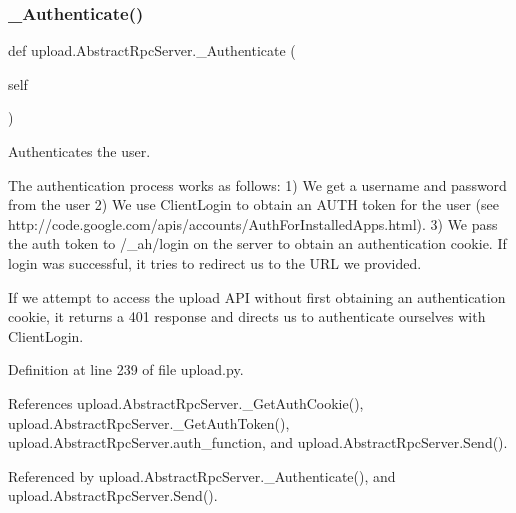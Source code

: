 \subsubsection{\texorpdfstring{\+\_\+\+Authenticate()}{\_Authenticate()}\hspace{0.1cm}{\footnotesize\ttfamily [1/2]}}
{\footnotesize\ttfamily def upload.\+Abstract\+Rpc\+Server.\+\_\+\+Authenticate (\begin{DoxyParamCaption}\item[{}]{self }\end{DoxyParamCaption})\hspace{0.3cm}{\ttfamily [private]}}

\begin{DoxyVerb}Authenticates the user.

The authentication process works as follows:
 1) We get a username and password from the user
 2) We use ClientLogin to obtain an AUTH token for the user
(see http://code.google.com/apis/accounts/AuthForInstalledApps.html).
 3) We pass the auth token to /_ah/login on the server to obtain an
authentication cookie. If login was successful, it tries to redirect
us to the URL we provided.

If we attempt to access the upload API without first obtaining an
authentication cookie, it returns a 401 response and directs us to
authenticate ourselves with ClientLogin.
\end{DoxyVerb}
 

Definition at line 239 of file upload.\+py.



References upload.\+Abstract\+Rpc\+Server.\+\_\+\+Get\+Auth\+Cookie(), upload.\+Abstract\+Rpc\+Server.\+\_\+\+Get\+Auth\+Token(), upload.\+Abstract\+Rpc\+Server.\+auth\+\_\+function, and upload.\+Abstract\+Rpc\+Server.\+Send().



Referenced by upload.\+Abstract\+Rpc\+Server.\+\_\+\+Authenticate(), and upload.\+Abstract\+Rpc\+Server.\+Send().


